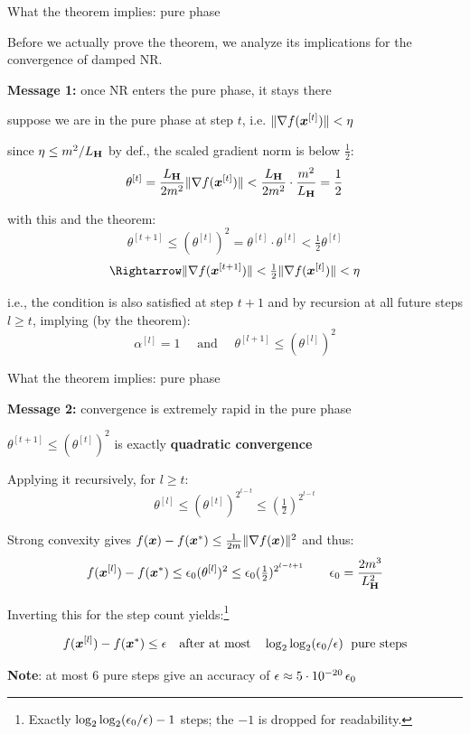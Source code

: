 \documentclass[11pt,compress,t,notes=noshow, xcolor=table]{beamer}
\newcommand{\LH}{L_{\H}}
\begin{document}
\begin{framei}[fs=small]{What the theorem implies: pure phase}
\item[] Before we actually prove the theorem, we analyze its implications for the convergence of damped NR.
\item \textbf{Message 1:} once NR enters the pure phase, it stays there
\begin{itemizeM}
  \item suppose we are in the pure phase at step $t$, i.e. $\|\nabla f(\bm{x}^{[t]})\| < \eta$
  \item since $\eta \le m^2/\LH$ by def., the scaled gradient norm is below $\tfrac{1}{2}$:
  $$\theta^{[t]} = \frac{\LH}{2m^2}\|\nabla f(\xv^{[t]})\|
  < \frac{\LH}{2m^2} \cdot \frac{m^2}{\LH} = \frac{1}{2}$$
  \item with this and the theorem:
  $$\theta^{[t+1]} \le (\theta^{[t]})^2 = \theta^{[t]} \cdot \theta^{[t]}
  < \tfrac{1}{2} \theta^{[t]}$$
  $$\Rightarrow \|\nabla f(\xv^{[t+1]})\| < \tfrac{1}{2} \|\nabla f(\xv^{[t]})\| < \eta$$
  \item i.e., the condition is also satisfied at step $t+1$ and by recursion at all future steps $l \geq t$, implying (by the theorem):
  $$\alpha^{[l]} = 1 \quad \text{ and } \quad \theta^{[l+1]} \le (\theta^{[l]})^2$$
\end{itemizeM}
\end{framei}

\begin{framei}[fs=small]{What the theorem implies: pure phase}
\item \textbf{Message 2:} convergence is extremely rapid in the pure phase
\begin{itemizeM}
\item $\theta^{[t+1]} \le (\theta^{[t]})^2$ is exactly \textbf{quadratic convergence}
\item Applying it recursively, for $l \geq t$:
$$\theta^{[l]} \le (\theta^{[t]})^{2^{l-t}} \leq (\tfrac{1}{2})^{2^{l-t}}$$
\item Strong convexity gives $f(\bm{x}) - f(\bm{x}^\ast) \le \frac{1}{2m}\|\nabla f(\bm{x})\|^2$ and thus:
$$f(\xv^{[l]}) - f(\xvs) \le \eps_0 (\theta^{[l]})^2
\le \eps_0 (\tfrac{1}{2})^{2^{l-t+1}} \qquad \eps_0 = \frac{2m^3}{\LH^2}$$
\item Inverting this for the step count yields:\footnote{\footnotesize Exactly
$\log_2 \log_2 (\epsilon_0/\epsilon) - 1$ steps; the $-1$ is dropped for readability.}
\begin{framed}
$$f(\bm{x}^{[l]}) - f(\bm{x}^\ast) \le \epsilon \quad \text{after at most} \quad \log_2 \log_2 (\epsilon_0/\epsilon)
\; \text{ pure steps}$$
\end{framed}
\item[$\Rightarrow$] \textbf{Note}: at most 6 pure steps give an accuracy of
$\epsilon \approx 5 \cdot 10^{-20} \, \epsilon_0$
\end{itemizeM}
\end{framei}
\end{document}
